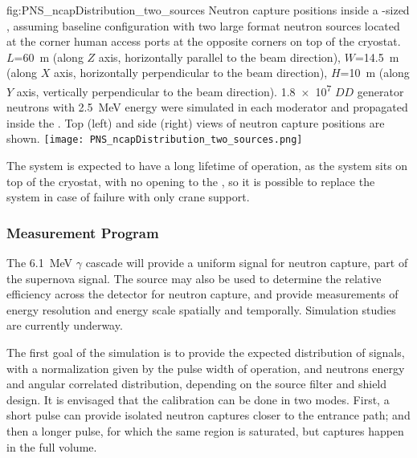 \begin{dunefigure}{fig:PNS_ncapDistribution_two_sources}
{Neutron capture positions inside a -sized , assuming baseline configuration with two large format neutron sources located at the corner human access ports at the opposite corners on top of the cryostat. $L$=\SI{60}{\m} (along $Z$ axis, horizontally parallel to the beam direction), $W$=\SI{14.5}{\m} (along $X$ axis, horizontally perpendicular to the beam direction), $H$=\SI{10}{\m} (along $Y$ axis, vertically perpendicular to the beam direction). \num{1.8e7} $DD$ generator neutrons with \SI{2.5}{\MeV} energy were simulated in each moderator and propagated inside the . Top (left) and side (right) views of neutron capture positions are shown.}
\texttt{[image: PNS\_ncapDistribution\_two\_sources.png]}
\end{dunefigure}

The system is expected to have a long lifetime of operation, as the  system sits on top of the cryostat, with no opening to the , so it is possible to replace the system in case of failure with only crane support.



\subsubsection{Measurement Program}
\label{sec:sp-calib-sys-pns-meas}

The \SI{6.1}{\MeV} $\gamma$ cascade will provide a uniform signal for neutron capture, part of the supernova signal. The source may also be used to determine the relative efficiency across the detector for neutron capture, and provide measurements of energy resolution and energy scale spatially and temporally. Simulation studies are currently underway.


The first goal of the simulation is to provide the expected distribution of signals, with a normalization given by the pulse width of  operation, and neutrons energy and angular correlated distribution, depending on the source filter and shield design.
It is envisaged that the calibration can be done in two modes. First, a short  pulse can provide isolated neutron captures closer to the entrance path; and then a longer 
pulse, for which the same region is saturated, but 
captures 
happen in the full volume.

